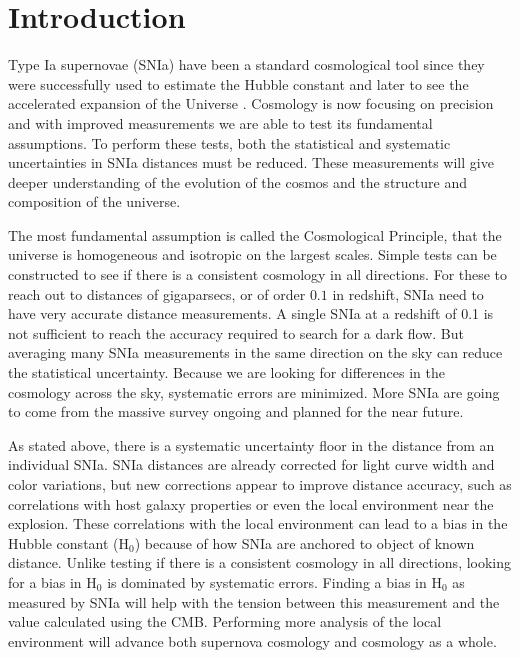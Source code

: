 \documentclass[apj, iop]{emulateapj}
\newcommand{\sn}{SNIa}
\newcommand{\Hubble}{\ensuremath{\text{H}_0}}
\begin{document}
\maketitle


\section{Introduction}\label{introduction} 

Type Ia supernovae (\sn{}) have been a standard cosmological tool since they
were successfully used to estimate the Hubble constant \citep{Hamuy95,Riess95}
and later to see the accelerated expansion of the Universe
\citep{Riess98,Perlmutter99}. Cosmology is now focusing on precision and with
improved measurements we are able to test its fundamental assumptions. To
perform these tests, both the statistical and systematic uncertainties in \sn{}
distances must be reduced. These measurements will give deeper understanding of
the evolution of the cosmos and the structure and composition of the universe.

The most fundamental assumption is called the Cosmological Principle, that the
universe is homogeneous and isotropic on the largest scales. Simple tests can be
constructed to see if there is a consistent cosmology in all directions. For
these to reach out to distances of gigaparsecs, or of order $0.1$ in redshift,
\sn{} need to have very accurate distance measurements. 
A single \sn{} at a redshift of 0.1 is not sufficient to reach the accuracy
required to search for a dark flow. But averaging many SNIa measurements in the
same direction on the sky can reduce the statistical uncertainty. Because we are
looking for differences in the cosmology across the sky, systematic errors are
minimized.
More \sn{} are going to come from the massive survey
ongoing and planned for the near future.

As stated above, there is a systematic uncertainty floor in the distance from an
individual \sn{}. \sn{} distances are already corrected for light curve width
and color variations, but new corrections appear to improve distance accuracy,
such as correlations with host galaxy properties or even the local environment
near the explosion. These correlations with the local environment can lead to a
bias in the Hubble constant (\Hubble{}) because of how \sn{} are anchored to
object of known distance. Unlike testing if there is a consistent cosmology in
all directions, looking for a bias in \Hubble{} is dominated by systematic
errors. Finding a bias in \Hubble{} as measured by \sn{} will help with the
tension between this measurement and the value calculated using the CMB.
Performing more analysis of the local environment will advance both supernova
cosmology and cosmology as a whole.
\end{document}
